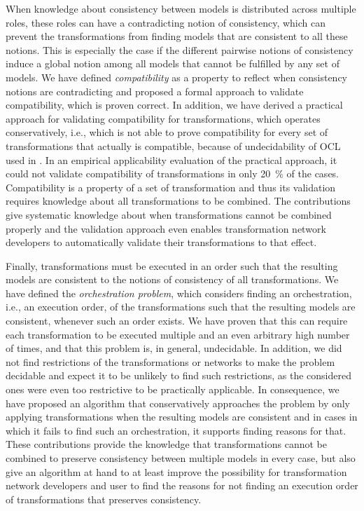When knowledge about consistency between models is distributed across multiple roles, these roles can have a contradicting notion of consistency, which can prevent the transformations from finding models that are consistent to all these notions.
This is especially the case if the different pairwise notions of consistency induce a global notion among all models that cannot be fulfilled by any set of models.
We have defined \emph{compatibility} as a property to reflect when consistency notions are contradicting and proposed a formal approach to validate compatibility, which is proven correct.
In addition, we have derived a practical approach for validating compatibility for \qvtr transformations, which operates conservatively, i.e., which is not able to prove compatibility for every set of transformations that actually is compatible, because of undecidability of \gls{OCL} used in \qvtr.
In an empirical applicability evaluation of the practical approach, it could not validate compatibility of transformations in only \SI{20}{\percent} of the cases.
Compatibility is a property of a set of transformation and thus its validation requires knowledge about all transformations to be combined.
The contributions give systematic knowledge about when transformations cannot be combined properly and the validation approach even enables transformation network developers to automatically validate their transformations to that effect.

Finally, transformations must be executed in an order such that the resulting models are consistent to the notions of consistency of all transformations.
We have defined the \emph{orchestration problem}, which considers finding an orchestration, i.e., an execution order, of the transformations such that the resulting models are consistent, whenever such an order exists.
We have proven that this can require each transformation to be executed multiple and an even arbitrary high number of times, and that this problem is, in general, undecidable.
In addition, we did not find restrictions of the transformations or networks to make the problem decidable and expect it to be unlikely to find such restrictions, as the considered ones were even too restrictive to be practically applicable.
In consequence, we have proposed an algorithm that conservatively approaches the problem by only applying transformations when the resulting models are consistent and in cases in which it fails to find such an orchestration, it supports finding reasons for that.
These contributions provide the knowledge that transformations cannot be combined to preserve consistency between multiple models in every case, but also give an algorithm at hand to at least improve the possibility for transformation network developers and user to find the reasons for not finding an execution order of transformations that preserves consistency.

